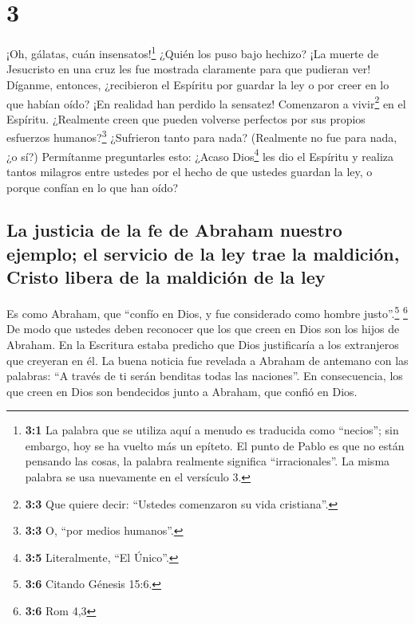 \hypertarget{section-2}{%
\section{3}\label{section-2}}

 ¡Oh, gálatas, cuán insensatos!\footnote{\textbf{3:1} La
  palabra que se utiliza aquí a menudo es traducida como ``necios''; sin
  embargo, hoy se ha vuelto más un epíteto. El punto de Pablo es que no
  están pensando las cosas, la palabra realmente significa
  ``irracionales''. La misma palabra se usa nuevamente en el versículo
  3.} ¿Quién los puso bajo hechizo? ¡La muerte de Jesucristo en una cruz
les fue mostrada claramente para que pudieran ver! 
Díganme, entonces, ¿recibieron el Espíritu por guardar la ley o por
creer en lo que habían oído?  ¡En realidad han perdido la
sensatez! Comenzaron a vivir\footnote{\textbf{3:3} Que quiere decir:
  ``Ustedes comenzaron su vida cristiana''.} en el Espíritu. ¿Realmente
creen que pueden volverse perfectos por sus propios esfuerzos
humanos?\footnote{\textbf{3:3} O, ``por medios humanos''.}
 ¿Sufrieron tanto para nada? (Realmente no fue para nada,
¿o sí?)  Permítanme preguntarles esto: ¿Acaso
Dios\footnote{\textbf{3:5} Literalmente, ``El Único''.} les dio el
Espíritu y realiza tantos milagros entre ustedes por el hecho de que
ustedes guardan la ley, o porque confían en lo que han oído?

\hypertarget{la-justicia-de-la-fe-de-abraham-nuestro-ejemplo-el-servicio-de-la-ley-trae-la-maldiciuxf3n-cristo-libera-de-la-maldiciuxf3n-de-la-ley}{%
\subsection{La justicia de la fe de Abraham nuestro ejemplo; el servicio
de la ley trae la maldición, Cristo libera de la maldición de la
ley}\label{la-justicia-de-la-fe-de-abraham-nuestro-ejemplo-el-servicio-de-la-ley-trae-la-maldiciuxf3n-cristo-libera-de-la-maldiciuxf3n-de-la-ley}}

 Es como Abraham, que ``confío en Dios, y fue considerado
como hombre justo''.\footnote{\textbf{3:6} Citando Génesis 15:6.}
\footnote{\textbf{3:6} Rom 4,3}  De modo que ustedes deben
reconocer que los que creen en Dios son los hijos de Abraham.
 En la Escritura estaba predicho que Dios justificaría a
los extranjeros que creyeran en él. La buena noticia fue revelada a
Abraham de antemano con las palabras: ``A través de ti serán benditas
todas las naciones''.  En consecuencia, los que creen en
Dios son bendecidos junto a Abraham, que confió en Dios.

